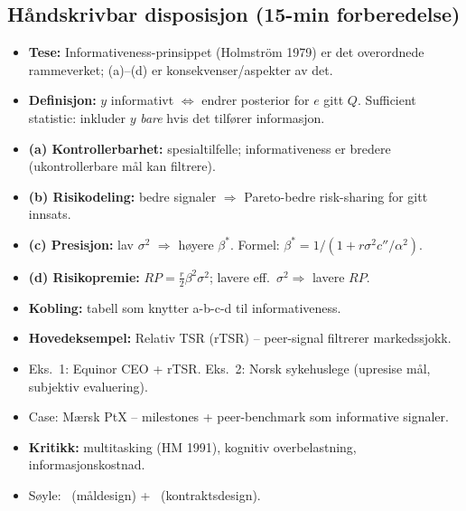 \subsection*{Håndskrivbar disposisjon (15-min forberedelse)}
\begin{itemize}\setlength{\itemsep}{2pt}
\item \textbf{Tese:} Informativeness-prinsippet (Holmström 1979) er det overordnede rammeverket; (a)--(d) er konsekvenser/aspekter av det.
\item \textbf{Definisjon:} $y$ informativt $\Leftrightarrow$ endrer posterior for $e$ gitt $Q$. Sufficient statistic: inkluder $y$ \emph{bare} hvis det tilfører informasjon.
\item \textbf{(a) Kontrollerbarhet:} spesialtilfelle; informativeness er bredere (ukontrollerbare mål kan filtrere).
\item \textbf{(b) Risikodeling:} bedre signaler $\Rightarrow$ Pareto-bedre risk-sharing for gitt innsats.
\item \textbf{(c) Presisjon:} lav $\sigma^2$ $\Rightarrow$ høyere $\beta^*$. Formel: $\beta^*=1/(1+r\sigma^2 c''/\alpha^2)$.
\item \textbf{(d) Risikopremie:} $RP=\tfrac{r}{2}\beta^2\sigma^2$; lavere eff.\ $\sigma^2 \Rightarrow$ lavere $RP$.
\item \textbf{Kobling:} tabell som knytter a-b-c-d til informativeness.
\item \textbf{Hovedeksempel:} Relativ TSR (rTSR) -- peer-signal filtrerer markedssjokk.
\item Eks.\ 1: Equinor CEO + rTSR. Eks.\ 2: Norsk sykehuslege (upresise mål, subjektiv evaluering).
\item Case: Mærsk PtX -- milestones + peer-benchmark som informative signaler.
\item \textbf{Kritikk:} multitasking (HM 1991), kognitiv overbelastning, informasjonskostnad.
\item Søyle: \STwo\ (måldesign) + \SThree\ (kontraktsdesign).
\end{itemize}
